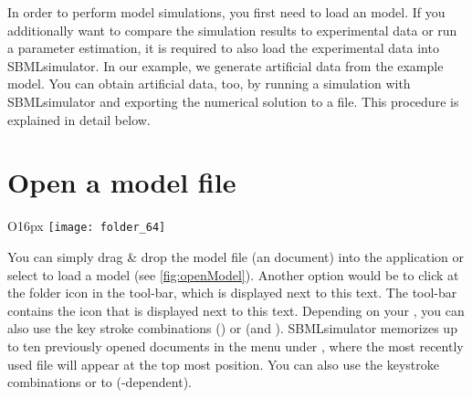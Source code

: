 


In order to perform model simulations, you first need to load an \SBML model. 
If you additionally want to compare the simulation results to experimental data or run a parameter estimation, it is required to also load the experimental data into SBMLsimulator.
In our example, we generate artificial data from the example model.
You can obtain artificial data, too, by running a simulation with SBMLsimulator and exporting the numerical solution to a \CSV file.
This procedure is explained in detail below.

\section{Open a model file}
\begin{wrapfigure}{O}{16px}
\vspace{\wrapfigspace}
\texttt{[image: folder\_64]}
\end{wrapfigure}
You can simply drag \& drop the model file (an \SBML document) into the application or select   to load a model (see \vref{fig:openModel}).
Another option would be to click at the folder icon in the tool-bar, which is displayed next to this text.
The tool-bar contains the icon that is displayed next to this text.
Depending on your \OS, you can also use the key stroke combinations  (\MacOSX) or  (\Linux and \Windows).
SBMLsimulator memorizes up to ten previously opened \SBML documents in the menu under , where the most recently used file will appear at the top most position.
You can also use the keystroke combinations \keys{\Altmac} or  to  (\OS-dependent).


